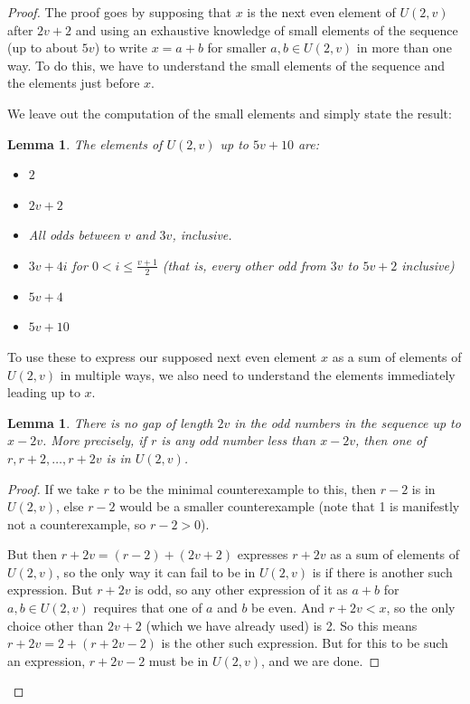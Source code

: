 \documentclass{article}
\newtheorem{lemma}[theorem]{Lemma}
\theoremstyle{definition}
\theoremstyle{remark}
\numberwithin{equation}{section}
\begin{document}
\begin{proof}
  The proof goes by supposing that $x$ is the next even element of
  $U(2,v)$ after $2v+2$ and using an exhaustive knowledge of small
  elements of the sequence (up to about $5v$) to write $x = a+b$ for
  smaller $a, b \in U(2,v)$ in more than one way.  To do this, we have
  to understand the small elements of the sequence and the elements
  just before $x$.  

  We leave out the computation of the small elements and simply state
  the result: 

  \begin{lemma}
    The elements of $U(2,v)$ up to $5v+10$ are: 

    \begin{itemize}
      \item $2$
      \item $2v+2$
      \item All odds between $v$ and $3v$, inclusive.
      \item $3v+4i$ for $0 < i \leq \frac{v+1}{2}$ (that is, every
        other odd from $3v$ to $5v+2$ inclusive)
      \item $5v+4$
      \item $5v+10$
    \end{itemize}
  \end{lemma}

  To use these to express our supposed next even element $x$ as a sum
  of elements of $U(2,v)$ in multiple ways, we also need to understand
  the elements immediately leading up to $x$.  

  \begin{lemma}
    There is no gap of length $2v$ in the odd numbers in the sequence
    up to $x-2v$.  More precisely, if $r$ is any odd number less than
    $x-2v$, then one of $r, r+2, \ldots, r+2v$ is in $U(2,v)$.  
  \end{lemma}
  \begin{proof}
    If we take $r$ to be the minimal counterexample to this, then $r-2$
    is in $U(2,v)$, else $r-2$ would be a smaller counterexample (note
    that 1 is manifestly not a counterexample, so $r-2 > 0$).  

    But then $r+2v = (r-2)+(2v+2)$ expresses $r+2v$ as a sum of
    elements of $U(2,v)$, so the only way it can fail to be in
    $U(2,v)$ is if there is another such expression.  But $r+2v$ is
    odd, so any other expression of it as $a+b$ for $a, b \in U(2,v)$
    requires that one of $a$ and $b$ be even.  And $r+2v < x$, so the
    only choice other than $2v+2$ (which we have already used) is 2.
    So this means $r+2v = 2+(r+2v-2)$ is the other such expression.
    But for this to be such an expression, $r+2v-2$ must be in
    $U(2,v)$, and we are done.
  \end{proof}


\end{proof}
\end{document}
